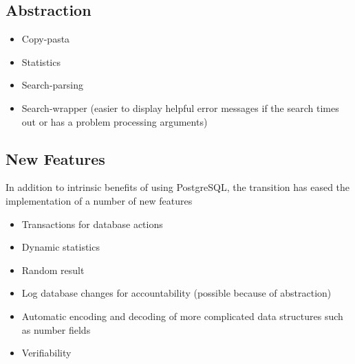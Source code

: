 \documentclass{article}
\begin{document}
\subsection{Abstraction}

\begin{itemize}
\item Copy-pasta
\item Statistics
\item Search-parsing
\item Search-wrapper (easier to display helpful error messages if the search times out or has a problem processing arguments)
\end{itemize}

\subsection{New Features}

In addition to intrinsic benefits of using PostgreSQL, the transition has eased the implementation of a number of new features
\begin{itemize}
\item Transactions for database actions
\item Dynamic statistics
\item Random result
\item Log database changes for accountability (possible because of abstraction)
\item Automatic encoding and decoding of more complicated data structures such as number fields
\item Verifiability
\end{itemize}
\end{document}

